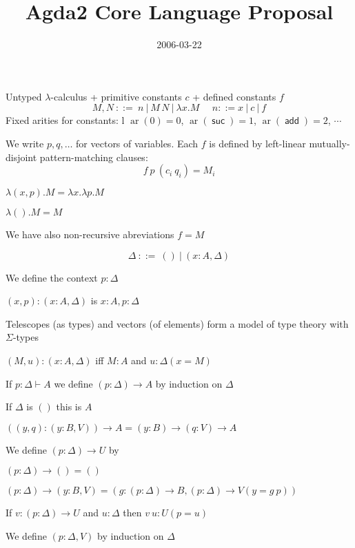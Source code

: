 \documentclass[25pt,dvips,fleqn]{foils}
\title{Agda2 Core Language Proposal}
\author{}
\date{2006-03-22}
\newcommand\ar{\mathop{\mathrm{ar}}}
\newcommand\add{\mathop{\mathsf{add}}}
\newcommand\suc{\mathop{\mathsf{suc}}}
\begin{document}
\maketitle
\rm


Untyped $\lambda$-calculus
+ primitive constants $c$ + defined constants $f$
$$
M,N ~::= ~n ~|~ M\,N ~|~ \lambda x.M ~~~~~~ n ::= x ~|~ c ~|~ f
$$
Fixed arities for constants:
\tabular[t]l $\ar(0)=0$, $\ar(\suc)=1$, $\ar(\add)=2$, $\cdots$ \endtabular


 We write $p,q,\dots$ for vectors of variables. Each $f$ is defined
by left-linear mutually-disjoint pattern-matching clauses:
$$f~p~(c_i~q_i) = M_i$$

 $\lambda (x,p).M = \lambda x.\lambda p.M$

 $\lambda ().M = M$

 We have also non-recursive abreviations $f=M$


 $$\Delta~::=~()~|~(x:A,\Delta)$$

 We define the context $p:\Delta$ 

 $(x,p):(x:A,\Delta)$ is $x:A,p:\Delta$

 Telescopes (as types) and vectors (of elements) form a model
of type theory with $\Sigma$-types

 $(M,u):(x:A,\Delta)$ iff $M:A$ and $u:\Delta(x=M)$


 If $p:\Delta\vdash A$ we define $(p:\Delta)\rightarrow A$ by induction on $\Delta$

 If $\Delta$ is $()$ this is $A$ 

 $((y,q):(y:B,V))\rightarrow A = (y:B)\rightarrow (q:V)\rightarrow A$

 We define $(p:\Delta)\rightarrow U$ by

 $(p:\Delta)\rightarrow () = ()$

 $(p:\Delta)\rightarrow (y:B,V) = (g:(p:\Delta)\rightarrow B,(p:\Delta)\rightarrow V(y=g~p))$

 If $v:(p:\Delta)\rightarrow U$ and $u:\Delta$ then $v~u:U(p=u)$


 We define $(p:\Delta,V)$ by induction on $\Delta$
\end{document}
